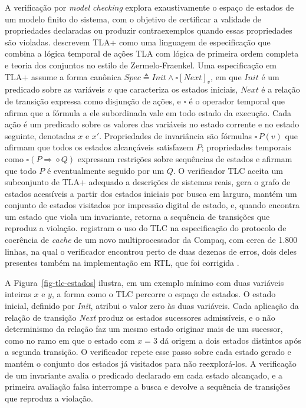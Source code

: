 A verificação por \emph{model checking} explora exaustivamente o espaço de estados de um modelo finito do sistema, com o objetivo de certificar a validade de propriedades declaradas ou produzir contraexemplos quando essas propriedades são violadas. \citet{yu_lamport_tla_modelchecking_1999} descrevem TLA+ como uma linguagem de especificação que combina a lógica temporal de ações TLA com lógica de primeira ordem completa e teoria dos conjuntos no estilo de Zermelo-Fraenkel. Uma especificação em TLA+ assume a forma canônica $\textit{Spec} \triangleq \textit{Init} \land \square [\textit{Next}]_v$, em que $\textit{Init}$ é um predicado sobre as variáveis $v$ que caracteriza os estados iniciais, $\textit{Next}$ é a relação de transição expressa como disjunção de ações, e $\square$ é o operador temporal que afirma que a fórmula a ele subordinada vale em todo estado da execução. Cada ação é um predicado sobre os valores das variáveis no estado corrente e no estado seguinte, denotadas $x$ e $x'$. Propriedades de invariância são fórmulas $\square \, P(v)$ que afirmam que todos os estados alcançáveis satisfazem $P$; propriedades temporais como $\square (P \Rightarrow \diamond Q)$ expressam restrições sobre sequências de estados e afirmam que todo $P$ é eventualmente seguido por um $Q$. O verificador TLC aceita um subconjunto de TLA+ adequado a descrições de sistemas reais, gera o grafo de estados acessíveis a partir dos estados iniciais por busca em largura, mantém um conjunto de estados visitados por impressão digital de estado, e, quando encontra um estado que viola um invariante, retorna a sequência de transições que reproduz a violação. \citet{yu_lamport_tla_modelchecking_1999} registram o uso do TLC na especificação do protocolo de coerência de \emph{cache} de um novo multiprocessador da Compaq, com cerca de 1.800 linhas, na qual o verificador encontrou perto de duas dezenas de erros, dois deles presentes também na implementação em RTL, que foi corrigida \citep[seção 7]{yu_lamport_tla_modelchecking_1999}.

A Figura~\ref{fig-tlc-estados} ilustra, em um exemplo mínimo com duas variáveis inteiras $x$ e $y$, a forma como o TLC percorre o espaço de estados. O estado inicial, definido por \textit{Init}, atribui o valor zero às duas variáveis. Cada aplicação da relação de transição \textit{Next} produz os estados sucessores admissíveis, e o não determinismo da relação faz um mesmo estado originar mais de um sucessor, como no ramo em que o estado com $x = 3$ dá origem a dois estados distintos após a segunda transição. O verificador repete esse passo sobre cada estado gerado e mantém o conjunto dos estados já visitados para não reexplorá-los. A verificação de um invariante avalia o predicado declarado em cada estado alcançado, e a primeira avaliação falsa interrompe a busca e devolve a sequência de transições que reproduz a violação.

